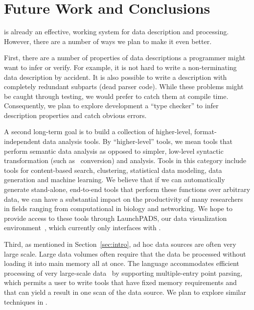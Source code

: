 \section{Future Work and Conclusions}
\label{sec:future}

\padsml{} is already an effective, working system for data description
and processing.  However, there are a number of ways we plan to make it 
even better.

First, there are a number of properties of data descriptions
a programmer might want to infer or verify.  For example, it is not hard to
write a non-terminating data description by accident.  It
is also possible to write a description with completely redundant
subparts (dead parser code).  While these problems might be caught 
through testing,
we would prefer to catch them at compile time.  
Consequently,
we plan to explore development a \padsml{} ``type checker'' 
to infer description properties and catch obvious errors.

A second long-term goal is to build a collection of
higher-level, format-independent data analysis tools.  By
``higher-level'' tools, we mean tools that perform semantic data
analysis as opposed to simpler, low-level syntactic transformation
(such as \xml\ conversion) and analysis.  
Tools in this category include tools for
content-based search, clustering, statistical data modeling, data 
generation and machine learning.  We believe that if we can automatically
generate stand-alone,
end-to-end tools that perform these functions over arbitrary data, 
we can have a substantial impact on the
productivity of many researchers in fields ranging from computational
in biology and networking.  We hope to provide access to these tools
through LaunchPADS, our data visualization 
environment~\cite{launchpads:planx,launchpads:sigmod}, which currently
only interfaces with \padsc{}.

Third, as mentioned in Section~\ref{sec:intro}, ad hoc data sources are often
very large scale.  Large data volumes often require that the data be
processed without loading it into main memory all at once.  The
\padsc{} language accommodates efficient processing of very
large-scale data~\cite{fisher+:pads} by supporting multiple-entry
point parsing, which permits a user to write tools that have fixed
memory requirements and that can yield a result in one scan of the
data source.  We plan to explore similar techniques in \padsml{}. 

